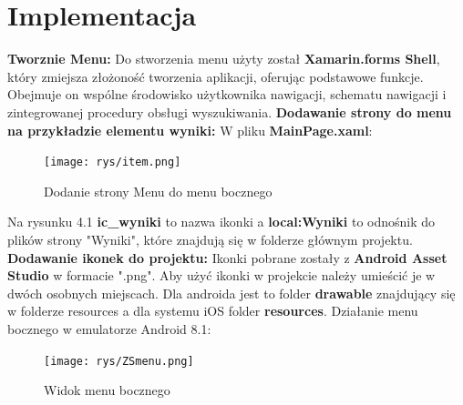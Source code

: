 	\newpage
\section{Implementacja}		%
\hspace{1cm} \textbf{Tworznie Menu:} \newline 
Do stworzenia menu użyty został \textbf{Xamarin.forms Shell}, który zmiejsza złożoność tworzenia aplikacji, oferując podstawowe funkcje. Obejmuje on wspólne środowisko użytkownika nawigacji, schematu nawigacji i zintegrowanej procedury obsługi wyszukiwania.
\newline
\newline
\textbf{Dodawanie strony do menu na przykładzie elementu wyniki:}
\newline
W pliku \textbf{MainPage.xaml}:
\newline
\newline
\begin{figure}[!htb]
	\begin{center}
		\texttt{[image: rys/item.png]}
		\caption{Dodanie strony Menu do menu bocznego}
		\label{rys:rysunek012}
	\end{center}
\end{figure}
\newline
Na rysunku 4.1 \textbf{ic\_wyniki} to nazwa ikonki a \textbf{local:Wyniki} to odnośnik do plików strony "Wyniki", które znajdują się w folderze głównym projektu. 
\newline
\newline
\textbf{Dodawanie ikonek do projektu:} \newline
Ikonki pobrane zostały z \textbf{Android Asset Studio} w formacie ".png". \newline
Aby użyć ikonki w projekcie należy umieścić je w dwóch osobnych miejscach. Dla androida jest to folder \textbf{drawable} znajdujący się w folderze resources a dla systemu iOS folder \textbf{resources}.
\newline \newline
\newpage
Działanie menu bocznego w emulatorze Android 8.1:
\begin{figure}[!htb]
	\begin{center}
		\texttt{[image: rys/ZSmenu.png]}
		\caption{Widok menu bocznego}
		\label{rys:rysunek013}
	\end{center}
\end{figure}


